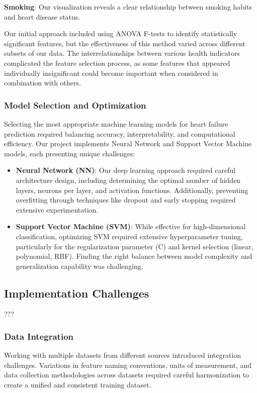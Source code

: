 \documentclass[11pt,a4paper]{article}
\newcommand{\greencheck}{\textcolor{green}{\ding{52}}}
\begin{document}
\textbf{Smoking}: Our visualization reveals a clear relationship between smoking habits and heart disease status.

Our initial approach included using ANOVA
F-tests to identify statistically significant features, but the
effectiveness of this method varied across different subsets
of our data.
The interrelationships between various health indicators complicated the feature
selection process, as some features that appeared
individually insignificant could become important when
considered in combination with others.

\subsubsection{Model Selection and Optimization}
\vspace{-0.25cm}
Selecting the most appropriate machine learning models for heart failure prediction required balancing accuracy, interpretability, and computational efficiency. Our project implements Neural Network and Support Vector Machine models, each presenting unique challenges:

\begin{itemize}
    \vspace{-0.25cm}
    \item \textbf{\greencheck \space Neural Network (NN)}: Our deep learning approach required careful architecture design, including determining the optimal number of hidden layers, neurons per layer, and activation functions. Additionally, preventing overfitting through techniques like dropout and early stopping required extensive experimentation.

    \item \textbf{\greencheck \space Support Vector Machine (SVM)}: While effective for high-dimensional classification, optimizing SVM required extensive hyperparameter tuning, particularly for the regularization parameter (C) and kernel selection (linear, polynomial, RBF). Finding the right balance between model complexity and generalization capability was challenging.
\end{itemize}

\subsection{Implementation Challenges}

???


\subsubsection{Data Integration}
\vspace{-0.25cm}
Working with multiple datasets from different sources
introduced integration challenges.
Variations in feature naming conventions, units of measurement,
and data collection methodologies across datasets required
careful harmonization to create a unified and consistent training dataset.
\end{document}
